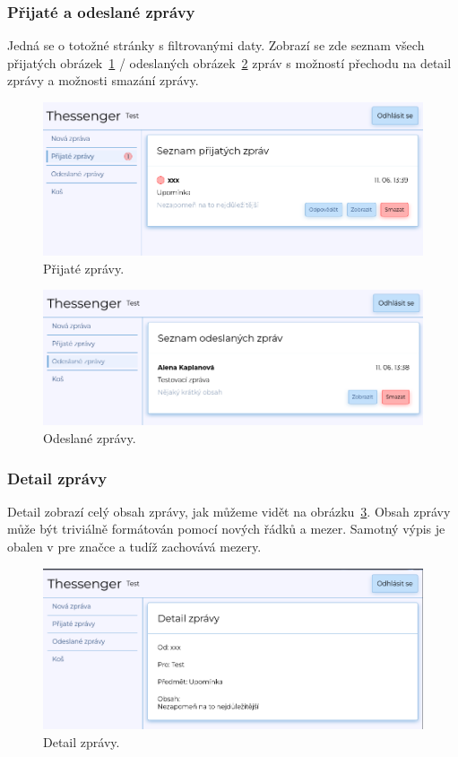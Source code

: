 \documentclass[
  master,
  program=ainf,
  tables=false,
  sourcecodes,
  glossaries,
  index
]{kidiplom}
\begin{document}
\subsubsection{Přijaté a odeslané zprávy}
Jedná se o totožné stránky s filtrovanými daty. Zobrazí se zde seznam všech
přijatých obrázek~\ref{fig:inobx} / odeslaných obrázek~\ref{fig:outbox} zpráv s možností přechodu na detail 
zprávy a možnosti smazání zprávy.

\begin{figure}[H]
  \centering
  \includegraphics[width=\textwidth]{graphics/thessenger_inbox.png}
  \caption{Přijaté zprávy.}
  \label{fig:inobx}
\end{figure}

\begin{figure}[H]
  \centering
  \includegraphics[width=\textwidth]{graphics/thessenger_outbox.png}
  \caption{Odeslané zprávy.}
  \label{fig:outbox}
\end{figure}

\subsubsection{Detail zprávy}
Detail zobrazí celý obsah zprávy, jak můžeme vidět na obrázku~\ref{fig:message_detail}. Obsah
zprávy může být triviálně formátován pomocí nových řádků a mezer. Samotný výpis je obalen v pre
značce a tudíž zachovává mezery.

\begin{figure}[H]
  \centering
  \includegraphics[width=\textwidth]{graphics/thessenger_message_detail.png}
  \caption{Detail zprávy.}
  \label{fig:message_detail}
\end{figure}
\end{document}
